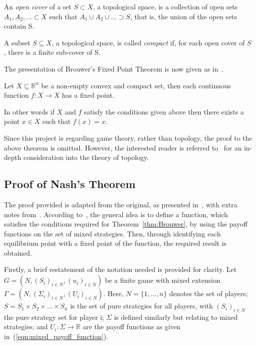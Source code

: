 \begin{definition}\label{def:open_cover}
    An \textit{open cover} of a set \(S \subset X\), a topological space, is a
    collection of open sets \(A_{1}, A_{2}, \ldots \subset X\) such that
    \(A_{1} \cup A_{2} \cup \ldots \supset S\), that is, the union of the open
    sets contain S.
\end{definition}

\begin{definition}\label{def:compact}
    A subset \(S \subseteq X\), a topological space, is called \textit{compact}
    if, for each open cover of \(S\), there is a finite sub-cover of S.
\end{definition}

The presentation of Brouwer's Fixed Point Theorem is now given as 
in~\cite{maschler_solan_zamir_2013}.

\begin{theorem}\label{thm:Brouwer}
    Let \(X \subseteq \mathbb{R}^{n}\) be a non-empty convex and compact
    set, then each continuous function \(f : X \to X\) has a fixed point.  
\end{theorem}

In other words if \(X\) and \(f\) satisfy the conditions given above then there
exists a point \(x \in X\) such that \(f(x) = x\). 

Since this project is regarding game theory, rather than topology, the proof to
the above theorem is omitted. However, the interested reader is referred
to~\cite{Henle1979} for an in-depth consideration into the theory of topology.

\subsection{Proof of Nash's Theorem}\label{subsec:Nash_Proof}
The proof provided is adapted from the original, as presented
in~\cite{nash1951non}, with extra notes from~\cite{maschler_solan_zamir_2013}.
According to~\cite{maschler_solan_zamir_2013}, the general idea is to
define a function, which satisfies the conditions required
for Theorem~\ref{thm:Brouwer}, by using the payoff functions on the set of mixed
strategies. Then, through identifying
each equilibrium point with a fixed point of the function, the required result 
is obtained.

Firstly, a brief restatement of the notation needed is provided for clarity.
Let \(G=(N, {(S_{i})}_{i \in N}, {(u_{i})}_{i \in N})\) be a finite game with
mixed extension \(\Gamma=(N, {(\Sigma_{i})}_{i \in N}, {(U_{i})}_{i \in N})\).
Here, \(N = \{1, \ldots, n\} \) denotes the set of players; \(S = S_{1} \times S_{2} \times
\ldots \times S_{n}\) is the set of pure strategies for all players, with
\({(S_i)}_{i \in N}\) the pure strategy set for player i; \(\Sigma \) is
defined similarly but relating to mixed strategies; and \(U_{i}: \Sigma \to
\mathbb{R}\) are the payoff functions as given in~(\ref{eqn:mixed_payoff_function}).

